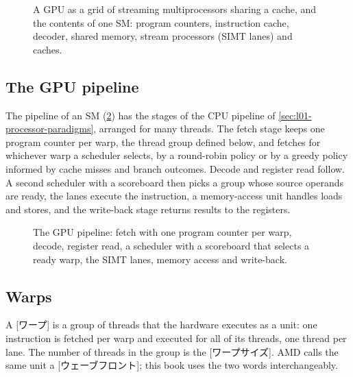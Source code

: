 \documentclass[../main.tex]{subfiles}
\begin{document}
\begin{figure}[htbp]
  \centering
  
  \caption{A GPU as a grid of streaming multiprocessors sharing a cache,
    and the contents of one SM: program counters, instruction cache,
    decoder, shared memory, stream processors (SIMT lanes) and caches.}
  \label{fig:l01-sm}
\end{figure}

\subsection{The GPU pipeline}

The pipeline of an SM (\cref{fig:l01-gpu-pipeline}) has the stages of
the CPU pipeline of \cref{sec:l01-processor-paradigms}, arranged for
many threads.  The fetch stage keeps one program counter per warp, the
thread group defined below, and fetches for whichever warp a scheduler
selects, by a
round-robin policy or by a greedy policy informed by cache misses and
branch outcomes.  Decode and register read follow.  A second scheduler
with a scoreboard then picks a group whose source operands are ready,
the lanes execute the instruction, a memory-access unit handles loads
and stores, and the write-back stage returns results to the
registers.

\begin{figure}[htbp]
  \centering
  
  \caption{The GPU pipeline: fetch with one program counter per warp,
    decode, register read, a scheduler with a scoreboard that selects a
    ready warp, the SIMT lanes, memory access and write-back.}
  \label{fig:l01-gpu-pipeline}
\end{figure}

\subsection{Warps}

\begin{definition}[Warp]
  \label{def:l01-warp}
  A [ワープ] is a group of threads that the hardware executes
  as a unit: one instruction is fetched per warp and executed for all
  of its threads, one thread per lane.  The number of threads in the
  group is the [ワープサイズ].  AMD calls the same unit
  a [ウェーブフロント]; this book uses the two words
  interchangeably.
\end{definition}
\end{document}
